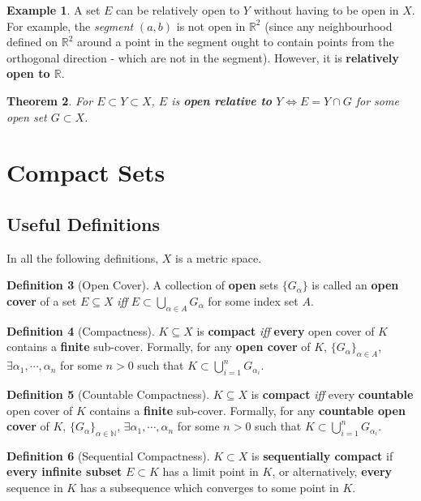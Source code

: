 \documentclass[a4paper,12pt]{report}
\newcommand{\N}{\mathbb{N}}
\newcommand{\R}{\mathbb{R}}
\newcommand{\tb}{\textbf}
\theoremstyle{plain}
\newtheorem{theorem}{\color{blue}Theorem}[chapter] %
\theoremstyle{definition}
\newtheorem{definition}[theorem]{\color{red}Definition} %
\newtheorem{example}[theorem]{\color{Orange}Example} %
\theoremstyle{remark}
\begin{document}
\begin{example}
A set $E$ can be relatively open to $Y$ without having to be open in $X$. For example, the \emph{segment} $(a,b)$ is not open in $\R^2$ (since any neighbourhood defined on $\R^2$ around a point in the segment ought to contain points from the orthogonal direction - which are not in the segment). However, it is \tb{relatively open to $\R$}.
\end{example}
\begin{theorem}
For $E\subset Y\subset X$, $E$ is \tb{open relative to} $Y\iff E=Y\cap G$ for some open set $G\subset X$.
\end{theorem}

\section{Compact Sets}
\subsection{Useful Definitions}
In all the following definitions, $X$ is a metric space.
\begin{definition}[Open Cover]
A collection of \tb{open} sets $\{G_\alpha\}$ is called an \tb{open cover} of a set $E\subseteq X$ \emph{iff} $E\subset \bigcup_{\alpha\in A} G_\alpha$ for some index set $A$.
\end{definition}
\begin{definition}[Compactness]
$K\subseteq X$ is \tb{compact} \emph{iff} \tb{every} open cover of $K$ contains a \tb{finite} sub-cover. Formally, for any \tb{open cover} of $K$, $\{G_\alpha\}_{\alpha\in A}$, $\exists \alpha_1,\cdots,\alpha_n$ for some $n>0$ such that $K\subset \bigcup_{i=1}^n G_{\alpha_i}$.
\end{definition}
\begin{definition}[Countable Compactness]
$K\subseteq X$ is \tb{compact} \emph{iff} every \tb{countable} open cover of $K$ contains a \tb{finite} sub-cover. Formally, for any \tb{countable open cover} of $K$, $\{G_\alpha\}_{\alpha\in\N}$, $\exists \alpha_1,\cdots,\alpha_n$ for some $n>0$ such that $K\subset \bigcup_{i=1}^n G_{\alpha_i}$.
\end{definition}
\begin{definition}[Sequential Compactness]
$K\subset X$ is \tb{sequentially compact} if \tb{every infinite subset} $E\subset K$ has a limit point in $K$, or alternatively, \tb{every} sequence in $K$ has a subsequence which converges to some point in $K$.
\end{definition}
\end{document}
